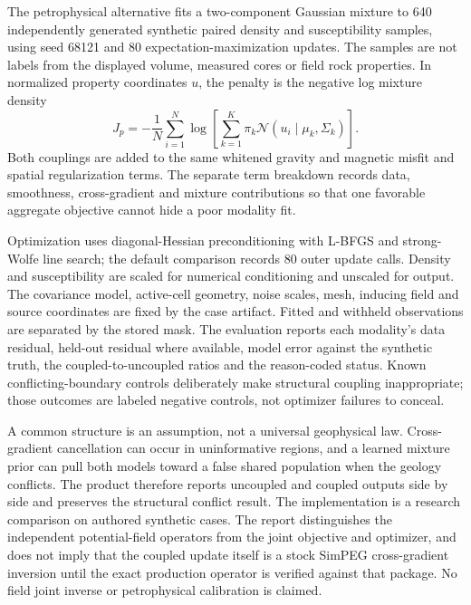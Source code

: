 The petrophysical alternative fits a two-component Gaussian mixture to
640 independently generated synthetic paired density and susceptibility
samples, using seed 68121 and 80 expectation-maximization updates. The
samples are not labels from the displayed volume, measured cores or
field rock properties. In normalized property coordinates \(u\), the
penalty is the negative log mixture density
\begin{equation}\label{eq:joint-mixture}
 J_p=-\frac{1}{N}\sum_{i=1}^{N}
 \log\left[\sum_{k=1}^{K}\pi_k
 \mathcal{N}(u_i\mid\mu_k,\Sigma_k)\right].
\end{equation}
Both couplings are added to the same whitened gravity and magnetic
misfit and spatial regularization terms. The separate term breakdown
records data, smoothness, cross-gradient and mixture contributions so
that one favorable aggregate objective cannot hide a poor modality fit.

Optimization uses diagonal-Hessian preconditioning with L-BFGS and
strong-Wolfe line search; the default comparison records 80 outer update
calls. Density and susceptibility are scaled for numerical conditioning
and unscaled for output. The covariance model, active-cell geometry,
noise scales, mesh, inducing field and source coordinates are fixed by
the case artifact. Fitted and withheld observations are separated by
the stored mask. The evaluation reports each modality's data residual,
held-out residual where available, model error against the synthetic
truth, the coupled-to-uncoupled ratios and the reason-coded status.
Known conflicting-boundary controls deliberately make structural
coupling inappropriate; those outcomes are labeled negative controls,
not optimizer failures to conceal.

A common structure is an assumption, not a universal geophysical law.
Cross-gradient cancellation can occur in uninformative regions, and a
learned mixture prior can pull both models toward a false shared
population when the geology conflicts. The product therefore reports
uncoupled and coupled outputs side by side and preserves the structural
conflict result. The implementation is a research comparison on
authored synthetic cases. The report distinguishes the independent
potential-field operators from the joint objective and optimizer, and
does not imply that the coupled update itself is a stock SimPEG
cross-gradient inversion until the exact production operator is verified
against that package. No field joint inverse or petrophysical
calibration is claimed.

